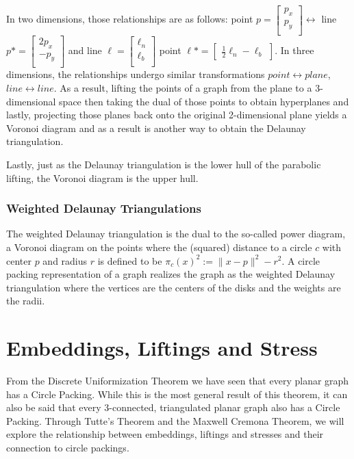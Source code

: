 \documentclass[11pt]{article}
\begin{document}
In two dimensions, those relationships are as follows: point $p = 
	\begin{bmatrix}
		p_x \\
		p_y \\
	\end{bmatrix} \leftrightarrow $ line $p* = 
	\begin{bmatrix}
		2p_x \\
		-p_y \\
	\end{bmatrix}$ and line $\ell = 
	\begin{bmatrix}
		\ell_n \\
		\ell_b \\
	\end{bmatrix}$ point $\ell* = 
	\begin{bmatrix}
		\frac{1}{2}\ell_n
		-\ell_b
	\end{bmatrix}$. In three dimensions, the relationships undergo similar transformations $point \leftrightarrow plane$, $line \leftrightarrow line$. As a result, lifting the points of a graph from the plane to a 3-dimensional space then taking the dual of those points to obtain hyperplanes and lastly, projecting those planes back onto the original 2-dimensional plane yields a Voronoi diagram and as a result is another way to obtain the Delaunay triangulation.
	
Lastly, just as the Delaunay triangulation is the lower hull of the parabolic lifting, the Voronoi diagram is the upper hull.


\subsubsection{Weighted Delaunay Triangulations}
The weighted Delaunay triangulation is the dual to the so-called power diagram, a Voronoi diagram on the points where the (squared) distance to a circle $c$ with center $p$ and radius $r$ is defined to be $\pi_c(x)^2 := \|x-p\|^2 - r^2$.
  A circle packing representation of a graph realizes the graph as the weighted Delaunay triangulation where the vertices are the centers of the disks and the weights are the radii.


\section{Embeddings, Liftings and Stress}
From the Discrete Uniformization Theorem we have seen that every planar graph has a Circle Packing. While this is the most general result of this theorem, it can also be said that every 3-connected, triangulated planar graph also has a Circle Packing. Through Tutte's Theorem and the Maxwell Cremona Theorem, we will explore the relationship between embeddings, liftings and stresses and their connection to circle packings.
\end{document}
